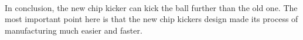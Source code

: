 \\
In conclusion, the new chip kicker can kick the ball further than the old one. The most important point here is that the new chip kickers design made its process of manufacturing much easier and faster. %



